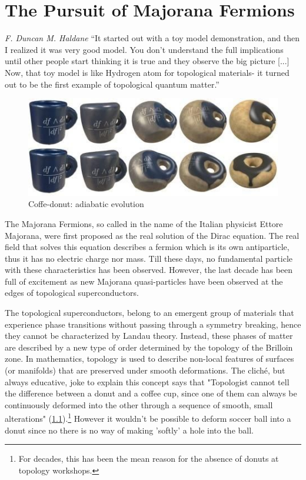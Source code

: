 \chapter{The Pursuit of Majorana Fermions \label{chap:Majorana}}

\begin{chapquote}{\textit{F. Duncan M. Haldane}}
``It started out with a toy model demonstration, and then I realized it was very good model.  You don't understand the full implications until other people start thinking it is true and they observe the big picture [...] Now, that toy model is like Hydrogen atom for topological materials- it turned out to be the first example of topological quantum matter.''
\end{chapquote}
\begin{figure}[b]
  \centering
  \includegraphics[scale = 0.5]{IMAGES/Majorana/Coffe&donuts.jpg}
  \caption{Coffe-donut: adiabatic evolution \label{fig:Coffe}}
\end{figure}

The  Majorana Fermions, so called in the name of the Italian physicist Ettore Majorana, were first proposed as the real solution of the Dirac equation. The real field that solves this equation describes a fermion which is its own antiparticle, thus it has no electric charge  nor mass.  Till these days, no fundamental particle with these characteristics has been observed. However, the last decade has been full of excitement as new Majorana quasi-particles have been observed at the edges of topological superconductors.

The topological superconductors, belong to an emergent group of materials that experience phase transitions without passing through a symmetry breaking, hence they cannot be characterized by Landau theory. Instead, these phases of matter are described by  a new type of order determined by the topology of the Brilloin zone. In mathematics, topology is used to describe non-local features of surfaces (or manifolds) that are preserved under smooth deformations. The clich\'e, but always educative, joke to explain this concept says that "Topologist cannot tell the difference between a donut and a coffee cup, since one of them 
can always be continuously deformed into the other through a
sequence of smooth, small alterations" (\ref{fig:Coffe}).\footnote{For decades, this has been the mean reason for the absence of donuts at topology workshops.} However it wouldn't be possible to deform soccer ball into  a donut since no there is no way of making 'softly' a hole into the ball.  

